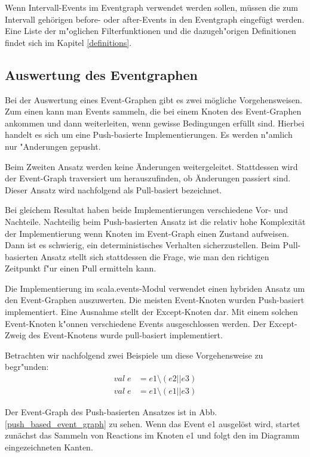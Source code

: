 Wenn Intervall-Events im Eventgraph verwendet werden sollen, müssen die zum
Intervall gehörigen before- oder after-Events in den Eventgraph eingefügt
werden. Eine Liste der m"oglichen Filterfunktionen und die dazugeh"origen 
Definitionen findet sich im Kapitel \ref{definitions}.

\subsection{Auswertung des Eventgraphen}

Bei der Auswertung eines Event-Graphen gibt es zwei mögliche Vorgehensweisen.
Zum einen kann man Events sammeln, die bei einem Knoten des Event-Graphen
ankommen und dann weiterleiten, wenn gewisse Bedingungen erfüllt sind. Hierbei handelt es sich um
eine Push-basierte Implementierungen. Es werden n"amlich nur "Anderungen gepusht.

Beim Zweiten Ansatz werden keine Änderungen weitergeleitet. Stattdessen wird
der Event-Graph traversiert um herauszufinden, ob Änderungen passiert sind. Dieser
Ansatz wird nachfolgend als Pull-basiert bezeichnet.

Bei gleichem Resultat haben beide Implementierungen verschiedene Vor- und
Nachteile. Nachteilig beim Push-basierten Ansatz ist die relativ hohe Komplexität
der Implementierung wenn Knoten im Event-Graph einen Zustand aufweisen.
Dann ist es schwierig, ein deterministisches Verhalten sicherzustellen. Beim
Pull-basierten Ansatz stellt sich stattdessen die Frage, wie man den richtigen
Zeitpunkt f"ur einen Pull ermitteln kann. 

Die Implementierung im scala.events-Modul verwendet einen hybriden Ansatz um den
Event-Graphen auszuwerten. Die meisten Event-Knoten wurden Push-basiert
implementiert. Eine Ausnahme stellt der Except-Knoten dar. Mit einem solchen
Event-Knoten k"onnen verschiedene Events ausgeschlossen werden. Der Except-Zweig
des Event-Knotens wurde pull-basiert implementiert.

Betrachten wir nachfolgend zwei Beispiele um diese Vorgehensweise zu begr"unden:
\begin{eqnarray}
val \; e & = e1 \setminus (e2 || e3)\\
val \; e & = e1 \setminus (e1 || e3)
\end{eqnarray}

Der Event-Graph des Push-basierten Ansatzes ist in
Abb.\ref{push_based_event_graph} zu sehen. Wenn das Event e1 ausgelöst wird,
startet zunächst das Sammeln von Reactions im Knoten e1 und folgt den im
Diagramm eingezeichneten Kanten. 
 
